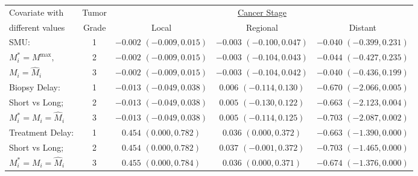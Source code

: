 \begin{tabular}{l|c|c|c|c}
\toprule
Covariate with & Tumor & \multicolumn{3}{c}{\underline{Cancer Stage}} \\
different values & Grade & Local & Regional & Distant \\
\midrule
SMU: & 1 & $-0.002$ $(-0.009, 0.015)$ & $-0.003$ $(-0.100, 0.047)$ & $-0.040$ $(-0.399, 0.231)$ \\
$M_i^*=M^{\max},$ & 2 & $-0.002$ $(-0.009, 0.015)$ & $-0.003$ $(-0.104, 0.043)$ & $-0.044$ $(-0.427, 0.235)$ \\
$M_i=\widehat{M}_i$ & 3 & $-0.002$ $(-0.009, 0.015)$ & $-0.003$ $(-0.104, 0.042)$ & $-0.040$ $(-0.436, 0.199)$ \\
\midrule
Biopsy Delay: & 1 & $-0.013$ $(-0.049, 0.038)$ & $0.006$ $(-0.114, 0.130)$ & $-0.670$ $(-2.066, 0.005)$ \\
Short vs Long; & 2 & $-0.013$ $(-0.049, 0.038)$ & $0.005$ $(-0.130, 0.122)$ & $-0.663$ $(-2.123, 0.004)$ \\
$M_i^*=M_i=\widehat{M}_i$ & 3 & $-0.013$ $(-0.049, 0.038)$ & $0.005$ $(-0.114, 0.125)$ & $-0.703$ $(-2.087, 0.002)$ \\
\midrule
Treatment Delay: & 1 & $0.454$ $(0.000, 0.782)$ & $0.036$ $(0.000, 0.372)$ & $-0.663$ $(-1.390, 0.000)$ \\
Short vs Long; & 2 & $0.454$ $(0.000, 0.782)$ & $0.037$ $(-0.001, 0.372)$ & $-0.703$ $(-1.465, 0.000)$ \\
$M_i^*=M_i=\widehat{M}_i$ & 3 & $0.455$ $(0.000, 0.784)$ & $0.036$ $(0.000, 0.371)$ & $-0.674$ $(-1.376, 0.000)$ \\
\bottomrule
\end{tabular}
